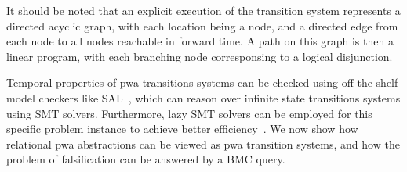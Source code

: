 It should be noted that an explicit execution of the transition system
represents a directed acyclic graph, with each location being a node,
and a directed edge from each node to all nodes reachable in forward
time. A path on this graph is then a linear program, with each
branching node corresponsing to a logical disjunction.

Temporal properties of pwa transitions systems can be checked using
off-the-shelf model checkers like SAL~\cite{SAL-SRI}, which can reason
over infinite state transitions systems using SMT solvers.
Furthermore, lazy SMT solvers can be employed for this specific
problem instance to achieve better efficiency~\cite{shoukry2017smc}.
We now show how relational pwa abstractions can be viewed as pwa
transition systems, and how the problem of falsification can
be answered by a BMC query.





